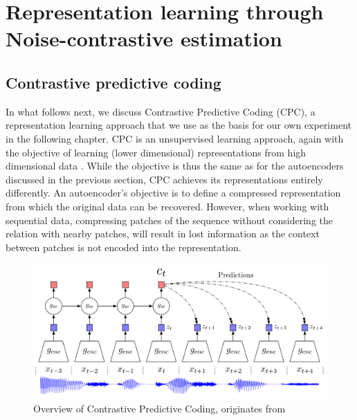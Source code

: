 

\section{Representation learning through Noise-contrastive estimation}




\subsection{Contrastive predictive coding}


	In what follows next, we discuss Contrastive Predictive Coding (CPC), a representation learning approach that we use as the basis for our own experiment in the following chapter.
	CPC is an unsupervised learning approach, again with the objective of learning (lower dimensional) representations from high dimensional data \cite{oordRepresentationLearningContrastive2019}. While the objective is thus the same as for the autoencoders discussed in the previous section, CPC achieves its representations entirely differently. An autoencoder's objective is to define a compressed representation from which the original data can be recovered. However, when working with sequential data, compressing patches of the sequence without considering the relation with nearby patches, will result in lost information as the context between patches is not encoded into the representation. %


\begin{figure}[h] %
	\centering
	\includegraphics[width=0.7\linewidth]{"cpc overview"}
	\caption{Overview of Contrastive Predictive Coding, originates from \cite{oordRepresentationLearningContrastive2019}}
	\label{fig:cpc-overview}
\end{figure}

